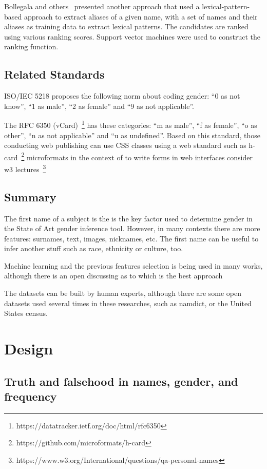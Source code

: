 \documentclass[a4paper]{article}
\begin{document}
Bollegala and others~\cite{bollegala2010automatic} presented
another approach that
used a lexical-pattern-based approach to extract aliases of a
given name, with a set of names and their aliases as training
data to extract lexical patterns. The candidates are ranked
using various ranking scores. Support vector machines were
used to construct the ranking function.

\subsection{Related Standards}

ISO/IEC 5218 proposes the following norm about coding
gender: ``0 as not know'', ``1 as male'', ``2 as female''
and ``9 as not applicable''.

The RFC 6350
(vCard)~\footnote{https://datatracker.ietf.org/doc/html/rfc6350}
has these categories: ``m as male'', ``f as
female'', ``o as other'', ``n as not applicable'' and ``u as
undefined''. Based on this standard, those conducting web
publishing can use CSS classes using a web standard such as
h-card~\footnote{https://github.com/microformats/h-card}
microformats in the context of to write forms in web interfaces
consider w3 lectures~\footnote{https://www.w3.org/International/questions/qa-personal-names}

\subsection{Summary}

The first name of a subject is the is the key factor used to
determine gender in the State of Art gender inference tool.
However, in many contexts there are more features: surnames,
text, images, nicknames, etc. The first name can be useful to
infer another stuff such as race, ethnicity or culture, too.

Machine learning and the previous features selection is being
used in many works, although there is an open discussing as
to which is the best approach

The datasets can be built by human experts, although there are
some open datasets used several times in these researches, such as
namdict, or the United States census.

\section{Design}
\label{sec:design}

\subsection{Truth and falsehood in names, gender, and frequency}
\label{sec:truthandfalsehood}
\end{document}
